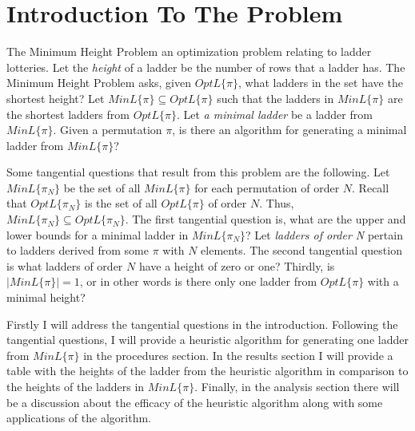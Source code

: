\section{Introduction To The Problem}
The Minimum Height Problem an optimization problem relating to ladder lotteries.
Let the \emph{height} of a ladder be the number of rows that a ladder has. 
The Minimum Height Problem asks, given $OptL\{\pi\}$, what ladders in the set have the shortest height? 
Let $MinL\{\pi\} \subseteq OptL\{\pi\}$ such that the ladders in $MinL\{\pi\}$ are the shortest ladders from 
$OptL\{\pi\}$. Let \emph{a minimal ladder} be a ladder from $MinL\{\pi\}$. Given a permutation $\pi$, is there an algorithm for generating a minimal ladder
from $MinL\{\pi\}$?\par  
Some tangential questions that result from this problem are the following. Let $MinL\{\pi_{N}\}$ 
be the set of all $MinL\{\pi\}$ for each permutation of order $N$. Recall that $OptL\{\pi_{N}\}$ is the set of all 
$OptL\{\pi\}$ of order $N$. Thus, $MinL\{\pi_{N}\} \subseteq OptL\{\pi_{N}\}$.  The first tangential question is, 
what are the upper and lower bounds for a minimal ladder in $MinL\{\pi_{N}\}$? 
Let \emph{ladders of order N} pertain to ladders derived from some $\pi$ with $N$ elements.
The second tangential question is what ladders of order $N$ have a height of zero or one? 
Thirdly, is $|MinL\{\pi\}|=1$, or in other words is there 
only one ladder from $OptL\{\pi\}$ with a minimal height?\par 



Firstly I will address the tangential questions in the introduction. Following the tangential questions, 
I will provide a heuristic algorithm for generating one ladder from $MinL\{\pi\}$ in the procedures section. 
In the results section I will provide a table with the heights of the ladder from the heuristic algorithm in comparison to the heights of the ladders
in $MinL\{\pi\}$. Finally, in the analysis section there will be a discussion 
about the efficacy of the heuristic algorithm along with some applications of the algorithm.\par 



